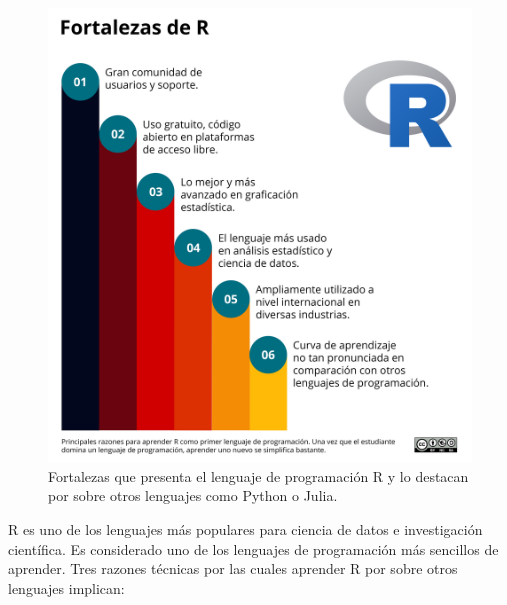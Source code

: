 \documentclass[
]{article}
\theoremstyle{definition}
\theoremstyle{definition}
\theoremstyle{definition}
\theoremstyle{definition}
\theoremstyle{remark}
\begin{document}
\begin{figure}

{\centering \includegraphics[width=1\linewidth]{figs/elaboradas/Por que R} 

}

\caption{Fortalezas que presenta el lenguaje de programación R y lo destacan por sobre otros lenguajes como Python o Julia.}\label{fig:figura01}
\end{figure}

R es uno de los lenguajes más populares para ciencia de datos e investigación científica. Es considerado uno de los lenguajes de programación más sencillos de aprender. Tres razones técnicas por las cuales aprender R por sobre otros lenguajes implican:
\end{document}
